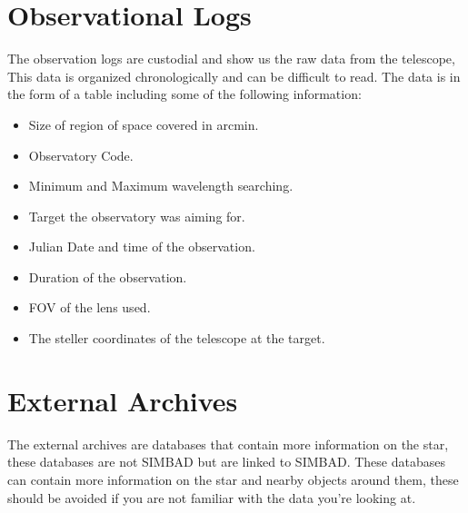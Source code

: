 \documentclass[12pt,oneside,a4paper,english]{article}
\begin{document}
    \section{Observational Logs}
    The observation logs are custodial and show us the raw data from the telescope, This data is organized chronologically and can be difficult to read. The data is in the form of a table including some of the following information:
    \begin{itemize}
        \item Size of region of space covered in arcmin.
        \item Observatory Code.
        \item Minimum and Maximum wavelength searching.
        \item Target the observatory was aiming for.
        \item Julian Date and time of the observation.
        \item Duration of the observation.
        \item FOV of the lens used.
        \item The steller coordinates of the telescope at the target.
    \end{itemize}
    \section{External Archives}
    The external archives are databases that contain more information on the star, these databases are not SIMBAD but are linked to SIMBAD. These databases can contain more information on the star and nearby objects around them, these should be avoided if you are not familiar with the data you're looking at.
\end{document}
